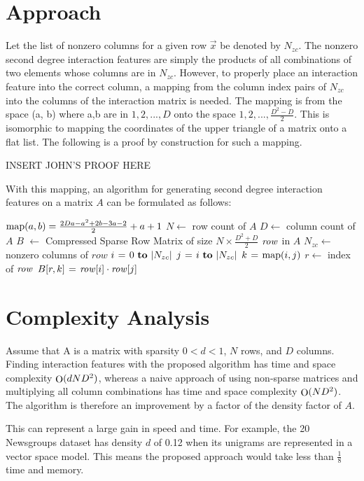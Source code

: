 \documentclass[11pt]{article}
\begin{document}
\section{Approach}
Let the list of nonzero columns for a given row $\vec{x}$ be denoted by $N_{zc}$. The nonzero second degree 
interaction features are simply the products of all combinations of two elements whose 
columns are in $N_{zc}$. However, to properly place an interaction feature into the correct column, a mapping from the column 
index pairs of $N_{zc}$ into the columns of the interaction matrix is needed. The mapping is 
from the space (a, b) where a,b are in $1,2,..., D$ onto the space $1,2,..., \frac{D^2-D}{2}$. This 
is isomorphic to mapping the coordinates of the upper triangle of a matrix onto a flat 
list. The following is a proof by construction for such a mapping.

INSERT JOHN'S PROOF HERE

With this mapping, an algorithm for generating second degree interaction features on a 
matrix $A$ can be formulated as follows:

\begin{codebox}
    \zi $\func{map}(a, b) = \frac{2Da-a^2+2b-3a-2}{2}+a+1$
    \zi $N \gets$ row count of $A$
    \zi $D \gets$ column count of $A$
    \zi $B$ $\gets$ Compressed Sparse Row Matrix of size $N \times \frac{D^2+D}{2}$
    \zi \For $\id{row}$ in $A$ \Do
    \zi     $N_{zc} \gets$ nonzero columns of $row$
    \zi     \For $i \gets 0 \To |N_{zc}|$ \Do
    \zi         \For $j \gets i \To |N_{zc}|$ \Do
    \zi             $k \gets \func{map}(i, j)$
    \zi             $r \gets$ index of $\id{row}$
    \zi             $B[r, k] \gets \id{row}[i] \cdot \id{row}[j]$
                \End
            \End
       	\End
\end{codebox}

\section{Complexity Analysis}
Assume that A is a matrix with sparsity $0 < d < 1$, $N$ rows, and $D$ columns. Finding 
interaction features with the proposed algorithm has time and space complexity 
$\func{O}(d N D^2)$, 
whereas a naive approach of using non-sparse matrices and multiplying all column 
combinations has time and space complexity $\func{O}(N D^2)$. The algorithm is therefore an 
improvement by a factor of the density factor of $A$.

This can represent a large gain in speed and time. For example, the 20 Newsgroups dataset 
has density $d$ of 0.12 when its unigrams are represented in a vector space model. This 
means the proposed approach would take less than $\frac{1}{8}$ time and memory.
\end{document}
